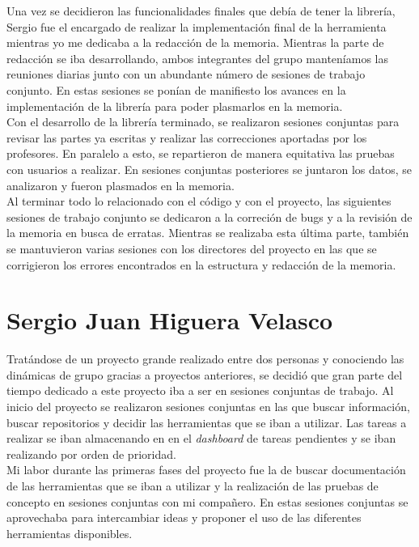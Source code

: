 Una vez se decidieron las funcionalidades finales que deb\'ia de tener la librer\'ia, Sergio fue el encargado de realizar la implementaci\'on final de la herramienta mientras yo me dedicaba a la redacci\'on de la memoria. Mientras la parte de redacci\'on se iba desarrollando, ambos integrantes del grupo manten\'iamos las reuniones diarias junto con un abundante n\'umero de sesiones de trabajo conjunto. En estas sesiones se pon\'ian de manifiesto los avances en la implementaci\'on de la librer\'ia para poder plasmarlos en la memoria.\\

Con el desarrollo de la librer\'ia terminado, se realizaron sesiones conjuntas para revisar las partes ya escritas y realizar las correcciones aportadas por los profesores. En paralelo a esto, se repartieron de manera equitativa las pruebas con usuarios a realizar. En sesiones conjuntas posteriores se juntaron los datos, se analizaron y fueron plasmados en la memoria.\\

Al terminar todo lo relacionado con el c\'odigo y con el proyecto, las siguientes sesiones de trabajo conjunto se dedicaron a la correci\'on de bugs y a la revisi\'on de la memoria en busca de erratas. Mientras se realizaba esta \'ultima parte, tambi\'en se mantuvieron varias sesiones con los directores del proyecto en las que se corrigieron los errores encontrados en la estructura y redacci\'on de la memoria.


\section{Sergio Juan Higuera Velasco}

Trat\'andose de un proyecto grande realizado entre dos personas y conociendo las din\'amicas de grupo gracias a proyectos anteriores, se decidi\'o que gran parte del tiempo dedicado a este proyecto iba a ser en sesiones conjuntas de trabajo. Al inicio del proyecto se realizaron sesiones conjuntas en las que buscar informaci\'on, buscar repositorios y decidir las herramientas que se iban a utilizar. Las tareas a realizar se iban almacenando en en el \textit{dashboard} de tareas pendientes y se iban realizando por orden de prioridad.\\

Mi labor durante las primeras fases del proyecto fue la de buscar documentaci\'on de las herramientas que se iban a utilizar y la realizaci\'on de las pruebas de concepto en sesiones conjuntas con mi compa\~nero. En estas sesiones conjuntas se aprovechaba para intercambiar ideas y proponer el uso de las diferentes herramientas disponibles. \\

